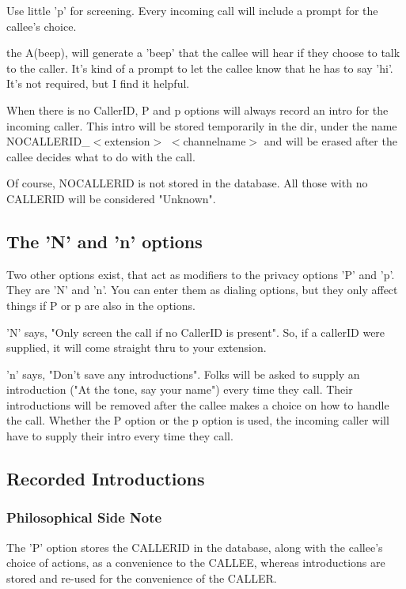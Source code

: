 Use little 'p' for screening. Every incoming call will include a
prompt for the callee's choice.

the A(beep), will generate a 'beep' that the callee will hear if they
choose to talk to the caller. It's kind of a prompt to let the callee
know that he has to say 'hi'. It's not required, but I find it
helpful.

When there is no CallerID, P and p options will always record an intro
for the incoming caller. This intro will be stored temporarily in the
 dir, under the name
NOCALLERID\_$<$extension$>$ $<$channelname$>$ and will be erased after the
callee decides what to do with the call.

Of course, NOCALLERID is not stored in the database. All those with no
CALLERID will be considered "Unknown".

\subsection{The 'N' and 'n' options}

Two other options exist, that act as modifiers to the privacy options
'P' and 'p'. They are 'N' and 'n'. You can enter them as dialing
options, but they only affect things if P or p are also in the
options.

'N' says, "Only screen the call if no CallerID is present". So, if a
callerID were supplied, it will come straight thru to your extension.

'n' says, "Don't save any introductions". Folks will be asked to
supply an introduction ("At the tone, say your name") every time they
call. Their introductions will be removed after the callee makes a
choice on how to handle the call. Whether the P option or the p option
is used, the incoming caller will have to supply their intro every
time they call.


\subsection{Recorded Introductions}

\subsubsection{Philosophical Side Note}
The 'P' option stores the CALLERID in the database, along with the
callee's choice of actions, as a convenience to the CALLEE, whereas
introductions are stored and re-used for the convenience of the CALLER.


